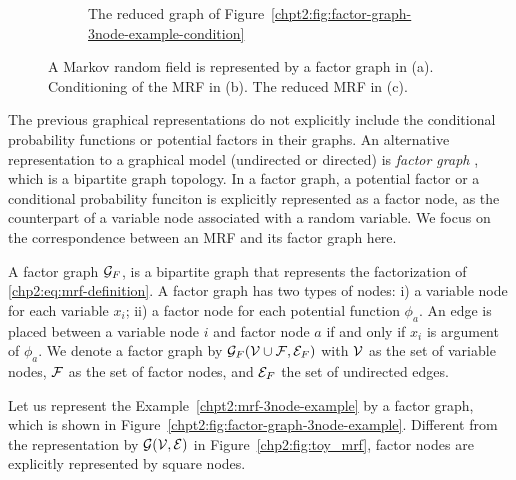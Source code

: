 \begin{figure}[!t]
\begin{subfigure}{.3\textwidth}
    \caption{The reduced graph of Figure~\ref{chpt2:fig:factor-graph-3node-example-condition}}
    \label{chpt2:fig:factor-graph-3node-example-reduced}
  \end{subfigure}
  
  \caption{A Markov random field is represented by a factor graph in (a). Conditioning of the MRF in (b). The reduced MRF in (c).}
  \label{chp2:tab:toy-factor-graph}
\end{figure}

The previous graphical representations do not explicitly include the conditional probability functions or potential factors in their graphs. An alternative representation to a graphical model (undirected or directed) is \textit{factor graph} \cite{kschischang2001factor_graph},
which is a bipartite graph topology. In a factor graph, a potential factor or a conditional probability funciton is explicitly represented as a factor node, as the counterpart of a variable node associated with a random variable. We focus on the correspondence between an MRF and its factor graph here.
\begin{definition}\label{chpt2:def:factor-graph}
  A factor graph $\mathcal{G}_F$, is a bipartite graph that represents the factorization of \eqref{chp2:eq:mrf-definition}. A factor graph has two types of nodes: i) a variable node for each variable $x_i$; ii) a factor node for each potential function $\phi_{a}$. An edge is placed between a variable node $i$ and factor node $a$ if and only if $x_i$ is argument of $\phi_{a}$. We denote a factor graph by $\mathcal{G}_F(\mathcal{V} \cup \mathcal{F}, \mathcal{E}_F)$ with $\mathcal{V}$ as the set of variable nodes, $\mathcal{F}$ as the set of factor nodes, and $\mathcal{E}_F$ the set of undirected edges.
\end{definition}
\begin{example}
  Let us represent the Example~\ref{chpt2:mrf-3node-example} by a factor graph, which is shown in Figure~\ref{chpt2:fig:factor-graph-3node-example}. Different from the representation by $\mathcal{G}(\mathcal{V}, \mathcal{E})$ in Figure~\ref{chp2:fig:toy_mrf}, factor nodes are explicitly represented by square nodes.
\end{example}


